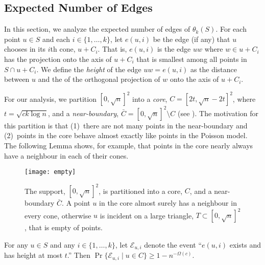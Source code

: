 \documentclass{patmorin}
\begin{document}
\subsection{Expected Number of Edges}

In this section, we analyze the expected number of edges of $\theta_k(S)$.
For each point $u\in S$ and each $i\in\{1,\ldots,k\}$, let $e(u,i)$ be
the edge (if any) that $u$ chooses in its $i$th cone, $u+C_i$.  That is,
$e(u,i)$ is the edge $uw$ where $w\in u+C_i$ has the projection onto
the axis of $u+C_i$ that is smallest among all points in $S\cap u+C_i$.
We define the \emph{height} of the edge $uw=e(u,i)$ as the distance
between $u$ and the of the orthogonal projection of $w$ onto the axis
of $u+C_i$.

For our analysis, we partition $[0,\sqrt{n}]^2$ into a
\emph{core}, $C=[2t,\sqrt{n}-2t]^2$, where $t=\sqrt{ck\log n}$,
and a \emph{near-boundary}, $\bar{C}=[0,\sqrt{n}]^2\setminus C$
(see ).  The motivation for this partition
is that (1)~there are not many points in the near-boundary
and (2)~points in the core behave almost exactly like points in the
Poisson model.  The following Lemma shows, for example, that points in
the core nearly always have a neighbour in each of their cones.

\begin{figure}
  \begin{center}
    \texttt{[image: empty]}
  \end{center}
  \caption{The support, $[0,\sqrt{n}]^2$, is partitioned into a core, $C$,
    and a near-boundary $\bar{C}$.  A point $u$ in the core almost surely
    has a neighbour in every cone, otherwise $u$ is incident on a large
    triangle, $T\subset [0,\sqrt{n}]^2$, that is empty of points.}
\end{figure}

\newcommand{\eui}{\mathcal{E}_{u,i}}
\newcommand{\neui}{\bar{\mathcal{E}}_{u,i}}

\begin{lem}
  For any $u\in S$ and any $i\in\{1,\ldots,k\}$, let $\eui$ denote
  the event ``$e(u,i)$ exists and has height at most $t$.''  Then
  $\Pr\{\eui\mid u\in C\} \ge 1-n^{-\Omega(c)}$.
\end{lem}
\end{document}
